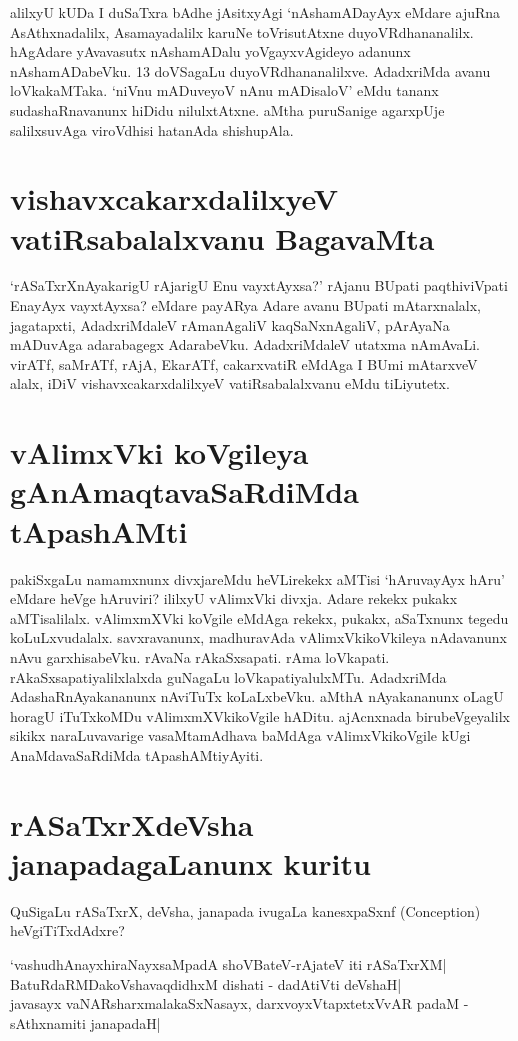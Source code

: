 alilxyU kUDa I duSaTxra bAdhe jAsitxyAgi `nAshamADayAyx eMdare ajuRna AsAthxnadalilx, Asamayadalilx karuNe toVrisutAtxne duyoVRdhananalilx. hAgAdare yAvavasutx nAshamADalu yoVgayxvAgideyo adanunx nAshamADabeVku. 13 doVSagaLu duyoVRdhananalilxve. AdadxriMda avanu loVkakaMTaka. `niVnu mADuveyoV nAnu mADisaloV' eMdu tananx sudashaRnavanunx hiDidu nilulxtAtxne. aMtha puruSanige agarxpUje salilxsuvAga viroVdhisi hatanAda shishupAla. 

\section*{vishavxcakarxdalilxyeV vatiRsabalalxvanu BagavaMta}

`rASaTxrXnAyakarigU rAjarigU Enu vayxtAyxsa?' rAjanu BUpati paqthiviVpati EnayAyx vayxtAyxsa? eMdare payARya Adare avanu BUpati mAtarxnalalx, jagatapxti, AdadxriMdaleV rAmanAgaliV kaqSaNxnAgaliV, pArAyaNa mADuvAga adarabagegx AdarabeVku. AdadxriMdaleV utatxma nAmAvaLi. virATf, saMrATf, rAjA, EkarATf, cakarxvatiR eMdAga I BUmi mAtarxveV alalx, iDiV vishavxcakarxdalilxyeV vatiRsabalalxvanu eMdu tiLiyutetx. 

\section*{vAlimxVki koVgileya gAnAmaqtavaSaRdiMda tApashAMti}

pakiSxgaLu namamxnunx divxjareMdu heVLirekekx aMTisi `hAruvayAyx hAru' eMdare heVge hAruviri? ililxyU vAlimxVki divxja. Adare rekekx pukakx aMTisalilalx. vAlimxmXVki koVgile eMdAga rekekx, pukakx, aSaTxnunx tegedu koLuLxvudalalx. savxravanunx, madhuravAda vAlimxVkikoVkileya nAdavanunx nAvu garxhisabeVku. rAvaNa rAkaSxsapati. rAma loVkapati. rAkaSxsapatiyalilxlalxda guNagaLu loVkapatiyalulxMTu. AdadxriMda AdashaRnAyakananunx nAviTuTx koLaLxbeVku. aMthA‌ nAyakananunx oLagU horagU iTuTxkoMDu vAlimxmXVkikoVgile hADitu. ajAcnxnada birubeVgeyalilx sikikx naraLuvavarige vasaMtamAdhava baMdAga vAlimxVkikoVgile kUgi AnaMdavaSaRdiMda tApashAMtiyAyiti.

\section*{rASaTxrXdeVsha janapadagaLanunx kuritu}

QuSigaLu rASaTxrX, deVsha, janapada ivugaLa kanesxpaSxnf ({\eng Conception}) heVgiTiTxdAdxre?

\begin{shloka}
`vashudhAnayxhiraNayxsaMpadA shoVBateV-rAjateV iti rASaTxrXM|\label{227}\\
BatuRdaRMDakoVshavaqdidhxM dishati - dadAtiVti deVshaH|\\
javasayx vaNARsharxmalakaSxNasayx, darxvoyxVtapxtetxVvAR padaM -\\
sAthxnamiti janapadaH|
\end{shloka}

